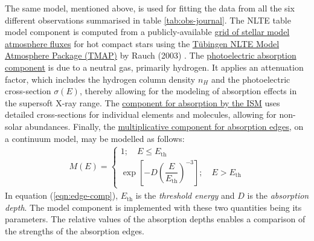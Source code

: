    	The same model, mentioned above, is used for fitting the data from all the six different observations summarised in table \ref{tab:obs-journal}. The NLTE table model component is computed from a publicly-available %
   	\href{http://astro.uni-tuebingen.de/~rauch/TMAF/TMAF.html}{grid of stellar model atmosphere fluxes} for hot compact stars using the \href{http://astro.uni-tuebingen.de/~rauch/TMAP/TMAP.html}{T\"{u}bingen NLTE Model Atmosphere Package (TMAP)} by Rauch (2003) \cite{rauch2003grid}. The %
   	\href{https://heasarc.gsfc.nasa.gov/xanadu/xspec/manual/XSmodelPhabs.html}{photoelectric absorption component} is due to a neutral gas, primarily hydrogen. It applies an attenuation factor, which includes the hydrogen column density $n_H$ and the photoelectric cross-section $\sigma(E)$, thereby allowing for the modeling of absorption effects in the supersoft X-ray range. The %
   	\href{https://heasarc.gsfc.nasa.gov/xanadu/xspec/manual/node255.html}{component for absorption by the ISM} uses detailed cross-sections for individual elements and molecules, allowing for non-solar abundances. Finally, the %
   	\href{https://heasarc.gsfc.nasa.gov/xanadu/xspec/manual/node247.html}{multiplicative component for absorption edges}, on a continuum model, may be modelled as follows:
    \begin{align}
    	M(E)=\begin{cases}
    		{1;\quad E\leqslant E_\text{th}} \\
    		{\exp{\left[ -D\left(\dfrac{E}{E_\text{th}}\right)^{-3} \right]};\quad E> E_\text{th}}
    	\end{cases} \label{eqn:edge-comp}
    \end{align}
    In equation (\ref{eqn:edge-comp}), $E_\text{th}$ is the \textit{threshold energy} and $D$ is the \textit{absorption depth}. The model component is implemented with these two quantities being its parameters. The relative values of the absorption depths enables a comparison of the strengths of the absorption edges.
    
